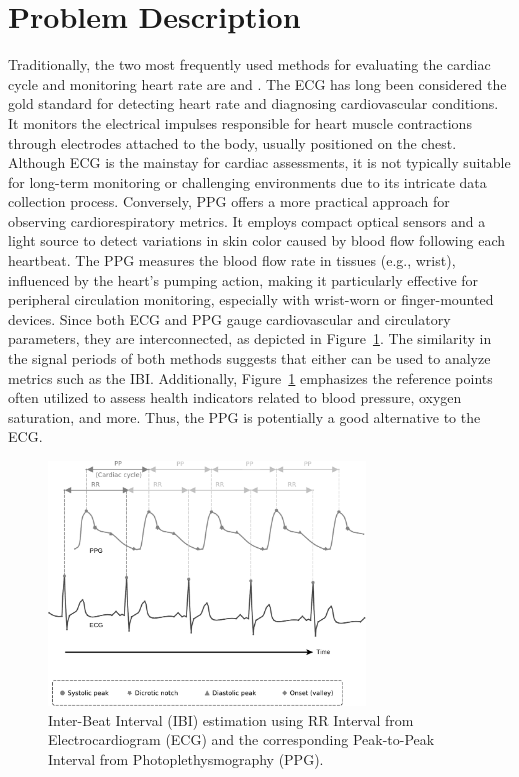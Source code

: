 \section{Problem Description}
\label{sec:problem}

Traditionally, the two most frequently used methods for evaluating the cardiac cycle and monitoring heart rate are  and . The \gls{ECG} has long been considered the gold standard for detecting heart rate and diagnosing cardiovascular conditions. It monitors the electrical impulses responsible for heart muscle contractions through electrodes attached to the body, usually positioned on the chest. Although \gls{ECG} is the mainstay for cardiac assessments, it is not typically suitable for long-term monitoring or challenging environments due to its intricate data collection process. Conversely, \gls{PPG} offers a more practical approach for observing cardiorespiratory metrics. It employs compact optical sensors and a light source to detect variations in skin color caused by blood flow following each heartbeat. The \gls{PPG} measures the blood flow rate in tissues (e.g., wrist), influenced by the heart's pumping action, making it particularly effective for peripheral circulation monitoring, especially with wrist-worn or finger-mounted devices. Since both \gls{ECG} and \gls{PPG} gauge cardiovascular and circulatory parameters, they are interconnected, as depicted in Figure~\ref{fig:ecg_and_ppg}. The similarity in the signal periods of both methods suggests that either can be used to analyze metrics such as the \gls{IBI}. Additionally, Figure~\ref{fig:ecg_and_ppg} emphasizes the reference points often utilized to assess health indicators related to blood pressure, oxygen saturation, and more. Thus, the \gls{PPG} is potentially a good alternative to the \gls{ECG}.

\begin{figure}[h!]
    \centering
    \includegraphics[width=0.75\textwidth]{img/ecg_ppg_signals.pdf}
    \caption{Inter-Beat Interval (IBI) estimation using RR Interval from Electrocardiogram (ECG) and the corresponding Peak-to-Peak Interval from Photoplethysmography (PPG).}
    \label{fig:ecg_and_ppg}
\end{figure}


